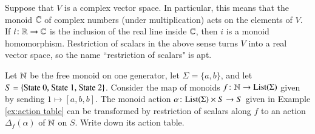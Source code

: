 \begin{example}

Suppose that $V$ is a complex vector space. In particular, this means that the monoid ${\mathbb C}$ of complex numbers (under multiplication) acts on the elements of $V$. If $i\colon{\mathbb R}\rightarrow{\mathbb C}$ is the inclusion of the real line inside ${\mathbb C}$, then $i$ is a monoid homomorphism. Restriction of scalars in the above sense turns $V$ into a real vector space, so the name ``restriction of scalars" is apt.

\end{example}

\begin{exercise}
Let ${\mathbb N}$ be the free monoid on one generator, let $\Sigma=\{a,b\}$, and let $S=\{\tn{State 0, State 1, State 2}\}$. Consider the map of monoids $f\taking\NN\to\List(\Sigma)$ given by sending $1\mapsto [a,b,b]$. The monoid action $\alpha\taking\List(\Sigma)\times S\to S$ given in Example \ref{ex:action table} can be transformed by restriction of scalars along $f$ to an action $\Delta_f(\alpha)$ of ${\mathbb N}$ on $S$. Write down its action table.
\end{exercise}


